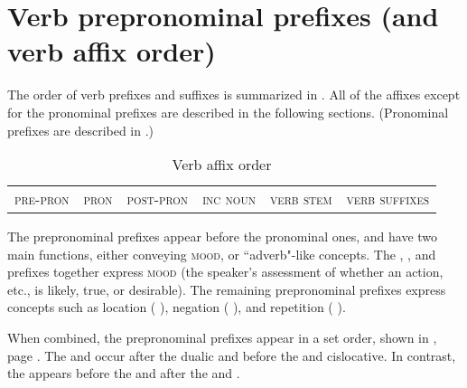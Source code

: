\chapter{Verb prepronominal prefixes (and verb affix order)} \label{Verb prepronominal prefixes}

The order of verb prefixes and suffixes is summarized in . All of the affixes except for the pronominal prefixes are described in the following sections. (Pronominal prefixes are described in .)


\begin{table}
\caption{Verb affix order}
\label{fig:1:vpreford}
\begin{tabularx}{\textwidth}{C|C|C|C|p{8mm}|C}
\textsc{pre-pron} & \textsc{pron} & \textsc{post-pron} & \textsc{inc noun} & \textsc{verb stem} & \textsc{verb suffixes}\\
\end{tabularx}
\end{table}

The prepronominal prefixes appear before the pronominal ones, and have two main functions, either conveying \textsc{mood}, or “adverb"-like concepts. The  {\factual},  {\future}, and  {\indefinite} prefixes together express \textsc{mood} (the speaker’s assessment of whether an action, etc., is likely, true, or desirable). The remaining prepronominal prefixes express concepts such as location ( \textsc{\translocative}), negation ( {\negative}), and repetition ( {\repetitive}).

When combined, the prepronominal prefixes appear in a set order, shown in , page \pageref{figtab:1:prepronorder}. The  {\future} and  {\indefinite} occur after the  {dualic} and before the  {\repetitive} and  {cislocative}. In contrast, the  {\factual} appears before the  {\dualic} and after the  {\repetitive} and  {\cislocative}.


